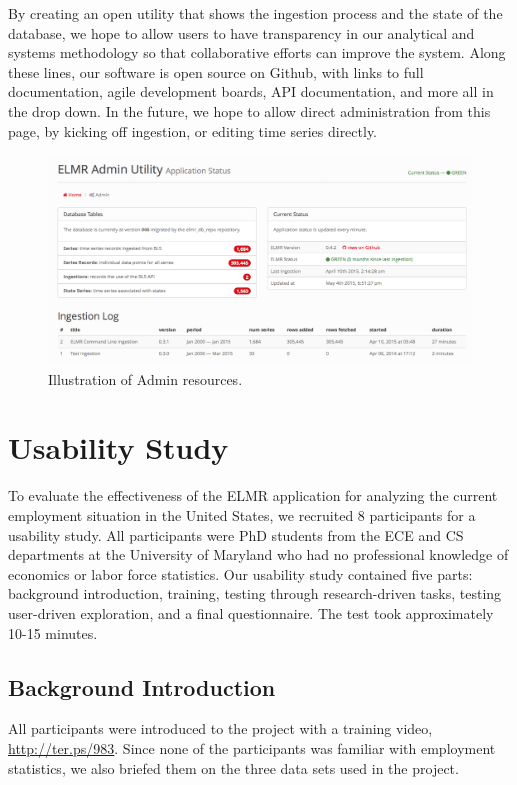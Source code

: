 \documentclass{sigchi}
\begin{document}
By creating an open utility that shows the ingestion process and the state of the database, we hope to allow users to have transparency in our analytical and systems methodology so that collaborative efforts can improve the system. Along these lines, our software is open source on Github, with links to full documentation, agile development boards, API documentation, and more all in the drop down. In the future, we hope to allow direct administration from this page, by kicking off ingestion, or editing time series directly.

\begin{figure}[!ht]
    \centering
    \includegraphics[width=1.75\columnwidth]{figures/Admin.png}
    \caption{Illustration of Admin resources.}
    \label{fig:admin}
\end{figure}

\section{Usability Study}

To evaluate the effectiveness of the ELMR application for analyzing the current employment situation in the United States, we recruited 8 participants for a usability study. All participants were PhD students from the ECE and CS departments at the University of Maryland who had no professional knowledge of economics or labor force statistics. Our usability study contained five parts: background introduction, training, testing through research-driven tasks, testing user-driven exploration, and a final questionnaire. The test took approximately 10-15 minutes.

\subsection{Background Introduction}

All participants were introduced to the project with a training video, \url{http://ter.ps/983}. Since none of the participants was familiar with employment statistics, we also briefed them on the three data sets used in the project.
\end{document}

